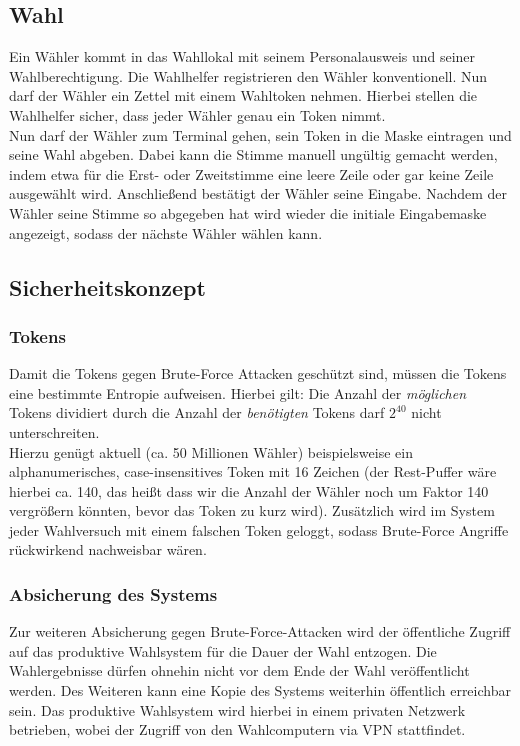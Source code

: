 \documentclass[a4paper]{scrreprt}
\begin{document}
\subsection{Wahl}

Ein Wähler kommt in das Wahllokal mit seinem Personalausweis und seiner Wahlberechtigung.
Die Wahlhelfer registrieren den Wähler konventionell.
Nun darf der Wähler ein Zettel mit einem Wahltoken nehmen.
Hierbei stellen die Wahlhelfer sicher, dass jeder Wähler genau ein Token nimmt. \\

Nun darf der Wähler zum Terminal gehen, sein Token in die Maske eintragen und seine Wahl abgeben. Dabei kann die Stimme manuell ungültig gemacht werden, indem etwa für die Erst- oder Zweitstimme eine leere Zeile oder gar keine Zeile ausgewählt wird.
Anschließend bestätigt der Wähler seine Eingabe. Nachdem der Wähler seine Stimme so abgegeben hat wird wieder die initiale Eingabemaske angezeigt, sodass der nächste Wähler wählen kann.

\subsection{Sicherheitskonzept}

\subsubsection{Tokens}

Damit die Tokens gegen Brute-Force Attacken geschützt sind, müssen die Tokens eine bestimmte Entropie aufweisen.
Hierbei gilt: Die Anzahl der \textit{möglichen} Tokens dividiert durch die Anzahl der \textit{benötigten} Tokens darf $2^{40}$ nicht unterschreiten. \\

Hierzu genügt aktuell (ca. 50 Millionen Wähler) beispielsweise ein alphanumerisches, case-insensitives Token mit 16 Zeichen (der Rest-Puffer wäre hierbei ca. 140, das heißt dass wir die Anzahl der Wähler noch um Faktor 140 vergrößern könnten, bevor das Token zu kurz wird).
Zusätzlich wird im System jeder Wahlversuch mit einem falschen Token geloggt, sodass Brute-Force Angriffe rückwirkend nachweisbar wären.

\subsubsection{Absicherung des Systems}

Zur weiteren Absicherung gegen Brute-Force-Attacken wird der öffentliche Zugriff auf das produktive Wahlsystem für die Dauer der Wahl entzogen. Die Wahlergebnisse dürfen ohnehin nicht vor dem Ende der Wahl veröffentlicht werden. Des Weiteren kann eine Kopie des Systems weiterhin öffentlich erreichbar sein. Das produktive Wahlsystem wird hierbei in einem privaten Netzwerk betrieben, wobei der Zugriff von den Wahlcomputern via VPN stattfindet.
\end{document}
